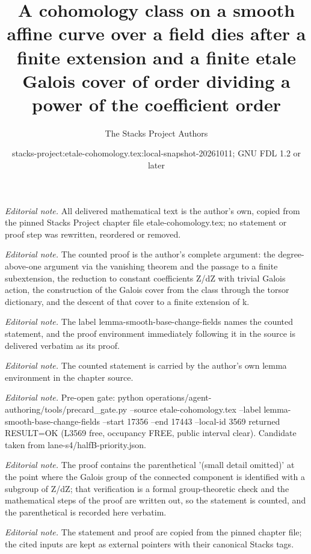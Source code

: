 \documentclass[10pt,a4paper]{amsart}
\title{A cohomology class on a smooth affine curve over a field dies after a finite extension and a finite etale Galois cover of order dividing a power of the coefficient order}
\author{The Stacks Project Authors}
\date{stacks-project:etale-cohomology.tex:local-snapshot-20261011; GNU FDL 1.2 or later}
\theoremstyle{plain}
\theoremstyle{definition}
\theoremstyle{remark}
\numberwithin{equation}{subsection}
\begin{document}
\maketitle
\noindent\textit{Editorial note.} All delivered mathematical text is the author's own, copied from the pinned Stacks Project chapter file etale-cohomology.tex; no statement or proof step was rewritten, reordered or removed.\par\medskip
\noindent\textit{Editorial note.} The counted proof is the author's complete argument: the degree-above-one argument via the vanishing theorem and the passage to a finite subextension, the reduction to constant coefficients Z/dZ with trivial Galois action, the construction of the Galois cover from the class through the torsor dictionary, and the descent of that cover to a finite extension of k.\par\medskip
\noindent\textit{Editorial note.} The label lemma-smooth-base-change-fields names the counted statement, and the proof environment immediately following it in the source is delivered verbatim as its proof.\par\medskip
\noindent\textit{Editorial note.} The counted statement is carried by the author's own lemma environment in the chapter source.\par\medskip
\noindent\textit{Editorial note.} Pre-open gate: python operations/agent-authoring/tools/precard\_gate.py --source etale-cohomology.tex --label lemma-smooth-base-change-fields --start 17356 --end 17443 --local-id 3569 returned RESULT=OK (L3569 free, occupancy FREE, public interval clear). Candidate taken from lane-s4/halfB-priority.json.\par\medskip
\noindent\textit{Editorial note.} The proof contains the parenthetical '(small detail omitted)' at the point where the Galois group of the connected component is identified with a subgroup of Z/dZ; that verification is a formal group-theoretic check and the mathematical steps of the proof are written out, so the statement is counted, and the parenthetical is recorded here verbatim.\par\medskip
\noindent\textit{Editorial note.} The statement and proof are copied from the pinned chapter file; the cited inputs are kept as external pointers with their canonical Stacks tags.\par\medskip
\end{document}
